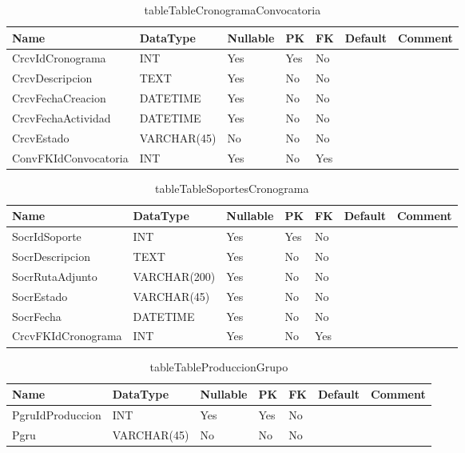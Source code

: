 \begin{table}
	\caption{tableTableCronogramaConvocatoria}
	\label{labelTableCronogramaConvocatoria}
	\begin{tabular}{ |l|l|l|l|l|l|l| }
		\hline
		Name & DataType & Nullable & PK & FK & Default & Comment \\ \hline
		CrcvIdCronograma & INT & Yes & Yes & No &  & \\ \hline 
		CrcvDescripcion & TEXT & Yes & No & No &  & \\ \hline 
		CrcvFechaCreacion & DATETIME & Yes & No & No &  & \\ \hline 
		CrcvFechaActividad & DATETIME & Yes & No & No &  & \\ \hline 
		CrcvEstado & VARCHAR(45) & No & No & No &  & \\ \hline 
		ConvFKIdConvocatoria & INT & Yes & No & Yes &  & \\ \hline 
		
	\end{tabular}
\end{table}


\begin{table}
	\caption{tableTableSoportesCronograma}
	\label{labelTableSoportesCronograma}
	\begin{tabular}{ |l|l|l|l|l|l|l| }
		\hline
		Name & DataType & Nullable & PK & FK & Default & Comment \\ \hline
		SocrIdSoporte & INT & Yes & Yes & No &  & \\ \hline 
		SocrDescripcion & TEXT & Yes & No & No &  & \\ \hline 
		SocrRutaAdjunto & VARCHAR(200) & Yes & No & No &  & \\ \hline 
		SocrEstado & VARCHAR(45) & Yes & No & No &  & \\ \hline 
		SocrFecha & DATETIME & Yes & No & No &  & \\ \hline 
		CrcvFKIdCronograma & INT & Yes & No & Yes &  & \\ \hline 
		
	\end{tabular}
\end{table}

\begin{table}
	\caption{tableTableProduccionGrupo}
	\label{labelTableProduccionGrupo}
	\begin{tabular}{ |l|l|l|l|l|l|l| }
		\hline
		Name & DataType & Nullable & PK & FK & Default & Comment \\ \hline
		PgruIdProduccion & INT & Yes & Yes & No &  & \\ \hline 
		Pgru & VARCHAR(45) & No & No & No &  & \\ \hline 
		
	\end{tabular}
\end{table}

